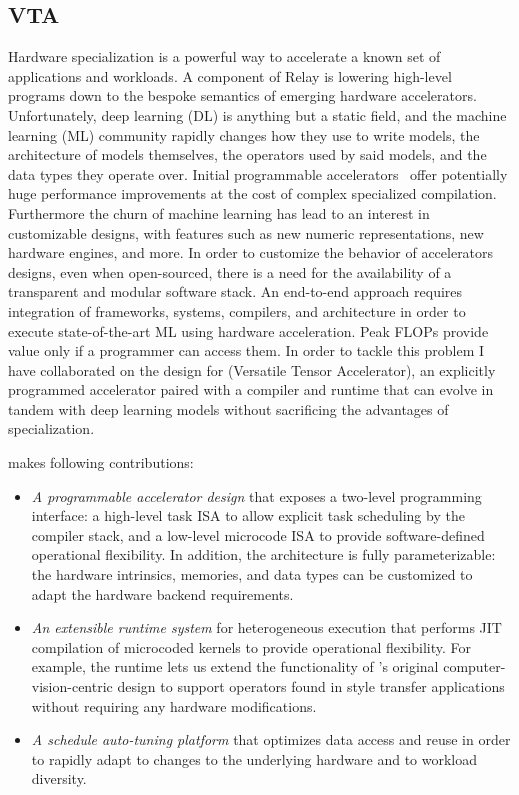 \subsection{VTA}

Hardware specialization is a powerful way to accelerate
  a known set of applications and workloads.
A component of Relay is lowering high-level programs down
  to the bespoke semantics of emerging hardware accelerators.
Unfortunately, deep learning (DL) is anything but a static field, and the machine learning (ML) community
  rapidly changes how they use to write models, the architecture of models themselves, the operators
  used by said models, and the data types they operate over.
Initial programmable accelerators~\citep{tpuv1} offer potentially huge performance
  improvements at the cost of complex specialized compilation.
Furthermore the churn of machine learning has lead to an interest
  in customizable designs, with features such as new numeric representations,
  new hardware engines, and more.
In order to customize the behavior of accelerators designs, even when open-sourced,
  there is a need for the availability of a transparent and modular software stack.
An end-to-end approach requires integration of frameworks, systems, compilers,
  and architecture in order to execute state-of-the-art ML using hardware acceleration.
Peak FLOPs provide value only if a programmer can access them.
In order to tackle this problem I have collaborated on the design for \vta (Versatile Tensor Accelerator),
  an explicitly programmed accelerator paired with a compiler and runtime that can evolve
  in tandem with deep learning models without sacrificing the advantages of specialization.

\vta makes following contributions:

\begin{itemize}
    \item \emph{A programmable accelerator design} that exposes a two-level programming interface: a high-level task ISA to allow explicit task scheduling by the compiler stack, and a low-level microcode ISA to provide software-defined operational flexibility.
    In addition, the \vta architecture is fully parameterizable: the hardware intrinsics, memories, and data types can be customized to adapt the hardware backend requirements.
    \item \emph{An extensible runtime system} for heterogeneous execution that performs JIT compilation of microcoded kernels to provide operational flexibility. For example, the \vta runtime lets us extend the functionality of \vta's original computer-vision-centric design to support operators found in style transfer applications without requiring any hardware modifications.
    \item \emph{A schedule auto-tuning platform} that optimizes data access and reuse in order to rapidly adapt to changes to the underlying hardware and to workload diversity.
\end{itemize}

